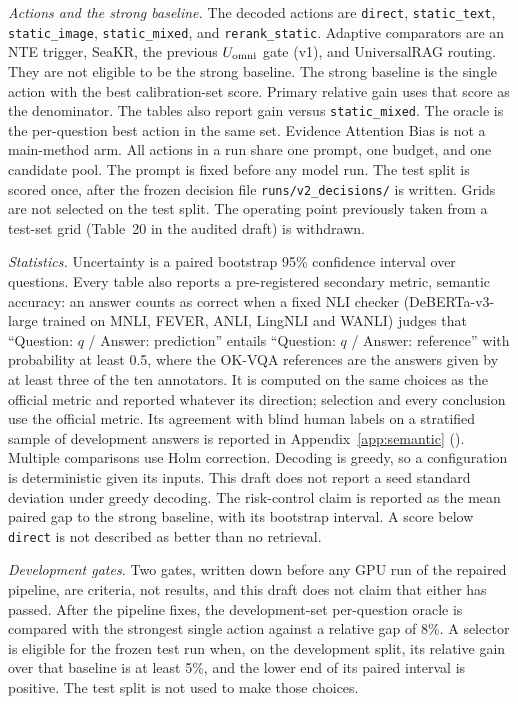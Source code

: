 \textit{Actions and the strong baseline.}
The decoded actions are \texttt{direct}, \texttt{static\_text}, \texttt{static\_image}, \texttt{static\_mixed}, and \texttt{rerank\_static}.
Adaptive comparators are an NTE trigger, SeaKR, the previous $U_{\mathrm{omni}}$ gate (v1), and UniversalRAG routing.
They are not eligible to be the strong baseline.
The strong baseline is the single action with the best calibration-set score.
Primary relative gain uses that score as the denominator.
The tables also report gain versus \texttt{static\_mixed}.
The oracle is the per-question best action in the same set.
Evidence Attention Bias is not a main-method arm.
All actions in a run share one prompt, one budget, and one candidate pool.
The prompt is fixed before any model run.
The test split is scored once, after the frozen decision file \texttt{runs/v2\_decisions/} is written.
Grids are not selected on the test split.
The operating point previously taken from a test-set grid (Table~20 in the audited draft) is withdrawn.

\textit{Statistics.}
Uncertainty is a paired bootstrap 95\% confidence interval over questions.
Every table also reports a pre-registered secondary metric, semantic accuracy: an answer counts as correct when a fixed NLI checker (DeBERTa-v3-large trained on MNLI, FEVER, ANLI, LingNLI and WANLI) judges that ``Question: $q$ / Answer: prediction'' entails ``Question: $q$ / Answer: reference'' with probability at least 0.5, where the OK-VQA references are the answers given by at least three of the ten annotators.
It is computed on the same choices as the official metric and reported whatever its direction; selection and every conclusion use the official metric.
Its agreement with blind human labels on a stratified sample of development answers is reported in Appendix~\ref{app:semantic} (\ph{}).
Multiple comparisons use Holm correction.
Decoding is greedy, so a configuration is deterministic given its inputs.
This draft does not report a seed standard deviation under greedy decoding.
The risk-control claim is reported as the mean paired gap to the strong baseline, with its bootstrap interval.
A score below \texttt{direct} is not described as better than no retrieval.

\textit{Development gates.}
Two gates, written down before any GPU run of the repaired pipeline, are criteria, not results, and this draft does not claim that either has passed.
After the pipeline fixes, the development-set per-question oracle is compared with the strongest single action against a relative gap of 8\%.
A selector is eligible for the frozen test run when, on the development split, its relative gain over that baseline is at least 5\%, and the lower end of its paired interval is positive.
The test split is not used to make those choices.

